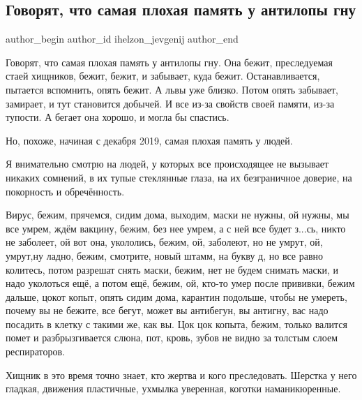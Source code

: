  
 
 
 
 
 
\subsection{Говорят, что самая плохая память у антилопы гну}
\label{sec:02_12_2021.fb.ihelzon_jevgenij.1.pamjat_antilopa_gnu}
 
\ifcmt
 author_begin
   author_id ihelzon_jevgenij
 author_end
\fi


Говорят, что самая плохая память у антилопы гну. Она бежит, преследуемая стаей
хищников, бежит, бежит, и забывает, куда бежит. Останавливается, пытается
вспомнить, опять бежит. А львы уже близко. Потом опять забывает, замирает, и
тут становится добычей. И все из-за свойств своей памяти, из-за тупости. А
бегает она хорошо, и могла бы спастись.

Но, похоже, начиная с декабря 2019, самая плохая память у людей. 

Я внимательно смотрю на людей, у которых все происходящее не вызывает никаких
сомнений, в их тупые стеклянные глаза, на их безграничное доверие, на
покорность и обречённость.

Вирус, бежим, прячемся, сидим дома, выходим, маски не нужны, ой нужны, мы все
умрем, ждём вакцину, бежим, без нее умрем, а с ней все будет з...сь, никто не
заболеет, ой вот она, укололись, бежим, ой, заболеют, но не умрут, ой, умрут,ну
ладно, бежим, смотрите, новый штамм, на букву д, но все равно колитесь, потом
разрешат снять маски, бежим, нет не будем снимать маски, и надо уколоться ещё,
а потом ещё, бежим, ой, кто-то умер после прививки, бежим дальше, цокот копыт,
опять сидим дома, карантин подольше, чтобы не умереть, почему вы не бежите, все
бегут, может вы антибегун, вы антигну, вас надо посадить в клетку с такими же,
как вы. Цок цок копыта, бежим, только валится помет и разбрызгивается слюна,
пот, кровь, зубов не видно за толстым слоем респираторов.

Хищник в это время точно знает, кто жертва и кого преследовать. Шерстка у него
гладкая, движения пластичные, ухмылка уверенная, коготки наманикюренные.

